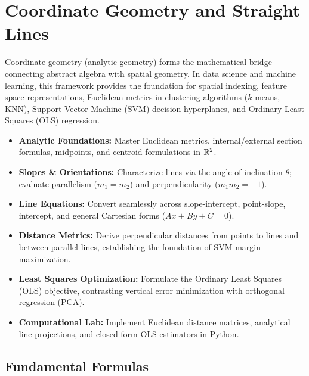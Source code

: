 \chapter{Coordinate Geometry and Straight Lines}

Coordinate geometry (analytic geometry) forms the mathematical bridge connecting abstract algebra with spatial geometry. In data science and machine learning, this framework provides the foundation for spatial indexing, feature space representations, Euclidean metrics in clustering algorithms ($k$-means, KNN), Support Vector Machine (SVM) decision hyperplanes, and Ordinary Least Squares (OLS) regression.

\vspace{0.3cm}
\begin{tcolorbox}[colback=primarylight, colframe=primarydark, title={\textbf{Executive Roadmap \& Learning Objectives}}]
\begin{itemize}
    \item \textbf{Analytic Foundations:} Master Euclidean metrics, internal/external section formulas, midpoints, and centroid formulations in $\mathbb{R}^2$.
    \item \textbf{Slopes \& Orientations:} Characterize lines via the angle of inclination $\theta$; evaluate parallelism ($m_1 = m_2$) and perpendicularity ($m_1 m_2 = -1$).
    \item \textbf{Line Equations:} Convert seamlessly across slope-intercept, point-slope, intercept, and general Cartesian forms ($Ax + By + C = 0$).
    \item \textbf{Distance Metrics:} Derive perpendicular distances from points to lines and between parallel lines, establishing the foundation of SVM margin maximization.
    \item \textbf{Least Squares Optimization:} Formulate the Ordinary Least Squares (OLS) objective, contrasting vertical error minimization with orthogonal regression (PCA).
    \item \textbf{Computational Lab:} Implement Euclidean distance matrices, analytical line projections, and closed-form OLS estimators in Python.
\end{itemize}
\end{tcolorbox}
\vspace{0.3cm}

\section{Fundamental Formulas}

